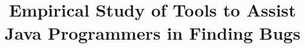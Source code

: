\pagestyle{fancyplain}

\newcommand{\tstamp}{\today}   
\renewcommand{\sectionmark}[1]{\markright{#1}}
\lhead[\Section \thesection]            {\fancyplain{}{\rightmark}}
\chead[\fancyplain{}{}]                 {\fancyplain{}{}}
\rhead[\fancyplain{}{\rightmark}]       {\fancyplain{}{\thepage}}
\cfoot[\fancyplain{\thepage}{}]         {\fancyplain{\thepage}{}}

\newlength{\myVSpace}%
\setlength{\myVSpace}{1ex}%
\newcommand\xstrut{\raisebox{-.5\myVSpace}%
  {\rule{0pt}{\myVSpace}}%
}

\renewcommand{\baselinestretch}{1.0}    %


\setlength{\parindent}{0.0in}
\setlength{\parskip}{0.1in}


\doublespacing

\def\widow#1{\vskip #1\vbadness10000\penalty-200\vskip-#1}


\makeatletter

\def\maketitle{%
  \thispagestyle{empty}%
  \begin{center}%
    {\Huge \@title\par}%
    {\normalsize \@author\par}%
    \vskip .4in
  \end{center}%

  }

\makeatother


\vspace*{-1.1in}
\title{Empirical Study of Tools to Assist Java Programmers in Finding Bugs}  %

